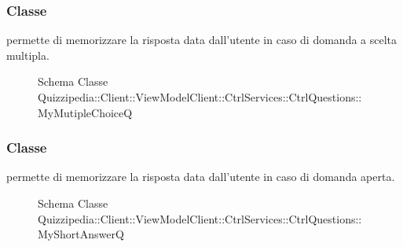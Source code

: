 \subsubsection{Classe }
permette di memorizzare la risposta data dall'utente in caso di domanda a scelta multipla.
\begin{figure}[H]
\centering
\noindent{}
\caption[Schema Classe MyMutipleChoiceQ]{Schema Classe Quizzipedia::Client::ViewModelClient::CtrlServices::CtrlQuestions::MyMutipleChoiceQ}
\end{figure}
\subsubsection{Classe }
permette di memorizzare la risposta data dall'utente in caso di domanda aperta.
\begin{figure}[H]
\centering
\noindent{}
\caption[Schema Classe MyShortAnswerQ]{Schema Classe Quizzipedia::Client::ViewModelClient::CtrlServices::CtrlQuestions::MyShortAnswerQ}
\end{figure}
